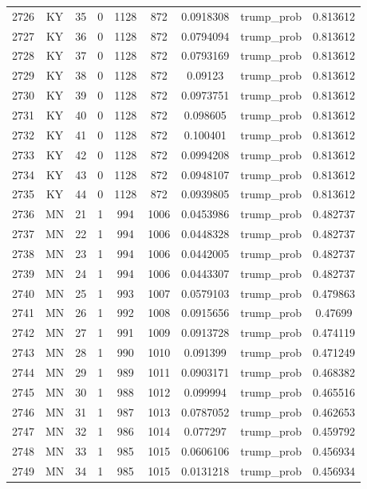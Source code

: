 \documentclass[12pt,a4paper]{article}
\begin{document}
\begin{tabular}{r|cccccccc}
	2726 & KY & 35 & 0 & 1128 & 872 & 0.0918308 & trump\_prob & 0.813612 \\
	2727 & KY & 36 & 0 & 1128 & 872 & 0.0794094 & trump\_prob & 0.813612 \\
	2728 & KY & 37 & 0 & 1128 & 872 & 0.0793169 & trump\_prob & 0.813612 \\
	2729 & KY & 38 & 0 & 1128 & 872 & 0.09123 & trump\_prob & 0.813612 \\
	2730 & KY & 39 & 0 & 1128 & 872 & 0.0973751 & trump\_prob & 0.813612 \\
	2731 & KY & 40 & 0 & 1128 & 872 & 0.098605 & trump\_prob & 0.813612 \\
	2732 & KY & 41 & 0 & 1128 & 872 & 0.100401 & trump\_prob & 0.813612 \\
	2733 & KY & 42 & 0 & 1128 & 872 & 0.0994208 & trump\_prob & 0.813612 \\
	2734 & KY & 43 & 0 & 1128 & 872 & 0.0948107 & trump\_prob & 0.813612 \\
	2735 & KY & 44 & 0 & 1128 & 872 & 0.0939805 & trump\_prob & 0.813612 \\
	2736 & MN & 21 & 1 & 994 & 1006 & 0.0453986 & trump\_prob & 0.482737 \\
	2737 & MN & 22 & 1 & 994 & 1006 & 0.0448328 & trump\_prob & 0.482737 \\
	2738 & MN & 23 & 1 & 994 & 1006 & 0.0442005 & trump\_prob & 0.482737 \\
	2739 & MN & 24 & 1 & 994 & 1006 & 0.0443307 & trump\_prob & 0.482737 \\
	2740 & MN & 25 & 1 & 993 & 1007 & 0.0579103 & trump\_prob & 0.479863 \\
	2741 & MN & 26 & 1 & 992 & 1008 & 0.0915656 & trump\_prob & 0.47699 \\
	2742 & MN & 27 & 1 & 991 & 1009 & 0.0913728 & trump\_prob & 0.474119 \\
	2743 & MN & 28 & 1 & 990 & 1010 & 0.091399 & trump\_prob & 0.471249 \\
	2744 & MN & 29 & 1 & 989 & 1011 & 0.0903171 & trump\_prob & 0.468382 \\
	2745 & MN & 30 & 1 & 988 & 1012 & 0.099994 & trump\_prob & 0.465516 \\
	2746 & MN & 31 & 1 & 987 & 1013 & 0.0787052 & trump\_prob & 0.462653 \\
	2747 & MN & 32 & 1 & 986 & 1014 & 0.077297 & trump\_prob & 0.459792 \\
	2748 & MN & 33 & 1 & 985 & 1015 & 0.0606106 & trump\_prob & 0.456934 \\
	2749 & MN & 34 & 1 & 985 & 1015 & 0.0131218 & trump\_prob & 0.456934 \\

\end{tabular}
\end{document}

